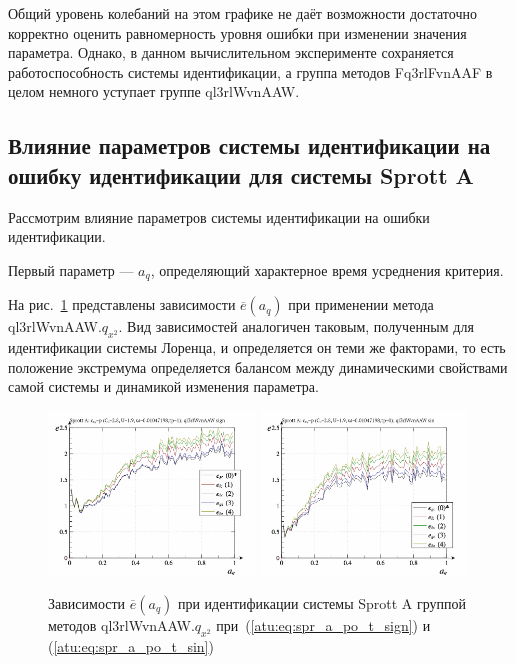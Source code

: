 Общий уровень колебаний на этом графике не даёт возможности достаточно корректно оценить
равномерность уровня ошибки при изменении значения параметра. Однако,
в данном вычислительном эксперименте сохраняется работоспособность системы идентификации,
а группа методов Fq3rlFvnAAF в целом немного уступает группе ql3rlWvnAAW.




\subsection{Влияние параметров системы идентификации на ошибку идентификации для системы Sprott A}  %


Рассмотрим влияние параметров системы идентификации на
ошибки идентификации.

Первый параметр ---
$a_q$, определяющий характерное время усреднения критерия.

На рис.~\ref{atu:f:spr_a_a_q_ql3rlWvnAAW_q_x2} представлены зависимости
$\overline{e}(a_q)$ при применении метода ql3rlWvnAAW.$q_{x^2}$.
Вид зависимостей аналогичен таковым, полученным для идентификации
системы Лоренца, и определяется он теми же факторами,
то есть положение экстремума определяется балансом между
динамическими свойствами самой системы и динамикой
изменения параметра.


\begin{figure}[htb!]
  \centerline{
    \includegraphics[width=0.49\textwidth]{p/cha/spr_a/ql3rlWvnAAW_x2/sprott_a_id-p_a_q_sign.png}
    \hfill
    \includegraphics[width=0.49\textwidth]{p/cha/spr_a/ql3rlWvnAAW_x2/sprott_a_id-p_a_q_sin.png}
  }
  \caption{Зависимости $\overline{e}(a_q)$ при идентификации системы Sprott A группой методов ql3rlWvnAAW.$q_{x^2}$
   при~(\ref{atu:eq:spr_a_po_t_sign}) и (\ref{atu:eq:spr_a_po_t_sin})}
  \label{atu:f:spr_a_a_q_ql3rlWvnAAW_q_x2}
\end{figure}


